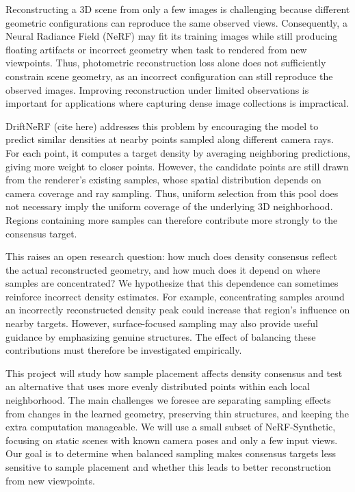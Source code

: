 \documentclass[sigconf]{acmart}
\begin{document}
Reconstructing a 3D scene from only a few images is challenging because different geometric configurations can reproduce the same observed views. Consequently, a Neural Radiance Field (NeRF) may fit its training images while still producing floating artifacts or incorrect geometry when task to rendered from new viewpoints. Thus, photometric reconstruction loss alone does not sufficiently constrain scene geometry, as an incorrect configuration can still reproduce the observed images. Improving reconstruction under limited observations is important for applications where capturing dense image collections is impractical.

DriftNeRF (cite here) addresses this problem by encouraging the model to predict similar densities at nearby points sampled along different camera rays. For each point, it computes a target density by averaging neighboring predictions, giving more weight to closer points. However, the candidate points are still drawn from the renderer's existing samples, whose spatial distribution depends on camera coverage and ray sampling. Thus, uniform selection from this pool does not necessary imply the uniform coverage of the underlying 3D neighborhood. Regions containing more samples can therefore contribute more strongly to the consensus target.

This raises an open research question: how much does density consensus reflect the actual reconstructed geometry, and how much does it depend on where samples are concentrated? We hypothesize that this dependence can sometimes reinforce incorrect density estimates. For example, concentrating samples around an incorrectly reconstructed density peak could increase that region's influence on nearby targets. However, surface-focused sampling may also provide useful guidance by emphasizing genuine structures. The effect of balancing these contributions must therefore be investigated empirically.

This project will study how sample placement affects density consensus and test an alternative that uses more evenly distributed points within each local neighborhood. The main challenges we foresee are separating sampling effects from changes in the learned geometry, preserving thin structures, and keeping the extra computation manageable. We will use a small subset of NeRF-Synthetic, focusing on static scenes with known camera poses and only a few input views. Our goal is to determine when balanced sampling makes consensus targets less sensitive to sample placement and whether this leads to better reconstruction from new viewpoints.
\end{document}

